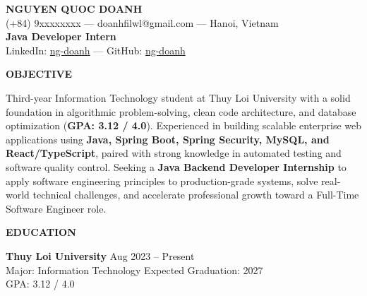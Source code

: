 ﻿\documentclass[11pt,a4paper]{article}
\newcommand{\cvsection}[1]{%
  \vspace{7pt}%
  \noindent\textbf{\large #1}\par%
  \vspace{3pt}%
}
\begin{document}
\begin{center}
    {\Large \textbf{NGUYEN QUOC DOANH}} \\[3pt]
    (+84) 9xxxxxxxx --- doanhfilwl@gmail.com --- Hanoi, Vietnam \\[2pt]
    \textbf{Java Developer Intern} \\[2pt]
    LinkedIn: \href{https://linkedin.com/in/ng-doanh}{ng-doanh} --- GitHub: \href{https://github.com/ng-doanh}{ng-doanh}
\end{center}

\vspace{-2pt}

\cvsection{OBJECTIVE}
Third-year Information Technology student at Thuy Loi University with a solid foundation in algorithmic problem-solving, clean code architecture, and database optimization (\textbf{GPA: 3.12 / 4.0}). Experienced in building scalable enterprise web applications using \textbf{Java, Spring Boot, Spring Security, MySQL, and React/TypeScript}, paired with strong knowledge in automated testing and software quality control. Seeking a \textbf{Java Backend Developer Internship} to apply software engineering principles to production-grade systems, solve real-world technical challenges, and accelerate professional growth toward a Full-Time Software Engineer role.

\cvsection{EDUCATION}
\noindent
\textbf{Thuy Loi University} \hfill Aug 2023 -- Present \\
Major: Information Technology \hfill Expected Graduation: 2027 \\
GPA: 3.12 / 4.0
\end{document}
